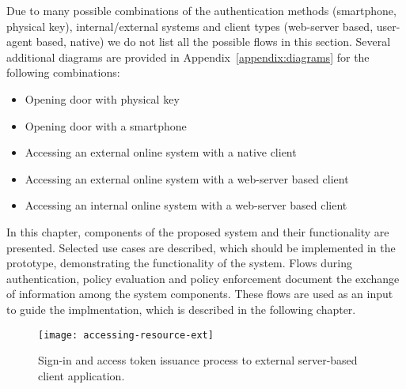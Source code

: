 \bigskip\noindent
Due to many possible combinations of the authentication methods (smartphone, physical key), internal/external systems and client types (web-server based, user-agent based, native) we do not list all the possible flows in this section. Several additional diagrams are provided in Appendix~\ref{appendix:diagrams} for the following combinations:
\begin{itemize}[noitemsep, nolistsep]
    \item Opening door with physical key
    \item Opening door with a smartphone
    \item Accessing an external online system with a native client
    \item Accessing an external online system with a web-server based client
    \item Accessing an internal online system with a web-server based client
\end{itemize}

\bigskip\noindent
In this chapter, components of the proposed system and their functionality are presented. Selected use cases are described, which should be implemented in the prototype, demonstrating the functionality of the system. Flows during authentication, policy evaluation and policy enforcement document the exchange of information among the system components. These flows are used as an input to guide the implmentation, which is described in the following chapter.

\begin{sidewaysfigure}[p]
    \centering
    \texttt{[image: accessing-resource-ext]}
    \caption{Sign-in and access token issuance process to external server-based client application.}
    \label{fig:accessing-resource-ext}
\end{sidewaysfigure}
\restoregeometry